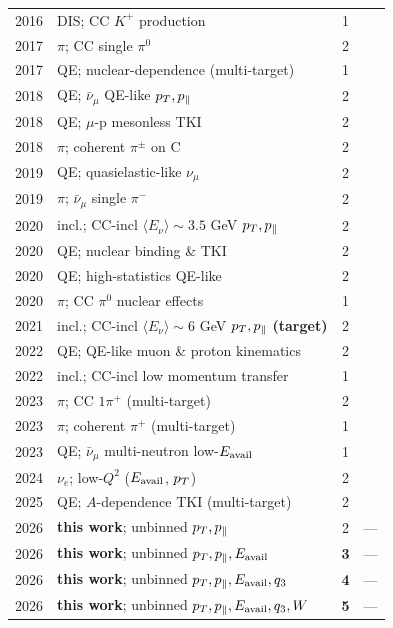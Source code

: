 {\begin{longtable}{@{}clcl@{}}
  2016 & DIS; CC $K^+$ production                  & 1 & \cite{MINERvA:2016kaon} \\
  2017 & $\pi$; CC single $\pi^0$                  & 2 & \cite{MINERvA:2017pi0} \\
  2017 & QE; nuclear-dependence (multi-target)     & 1 & \cite{MINERvA:2017Adep} \\
  2018 & QE; $\bar\nu_\mu$ QE-like $p_{T},p_{\parallel}$     & 2 & \cite{MINERvA:2018hba} \\
  2018 & QE; $\mu$-p mesonless TKI                 & 2 & \cite{MINERvA:2018tcb} \\
  2018 & $\pi$; coherent $\pi^\pm$ on C            & 2 & \cite{MINERvA:2018coh} \\
  2019 & QE; quasielastic-like $\nu_\mu$           & 2 & \cite{MINERvA:2019qe} \\
  2019 & $\pi$; $\bar\nu_\mu$ single $\pi^-$       & 2 & \cite{MINERvA:2019pim} \\
  2020 & incl.; CC-incl $\langle E_\nu\rangle\!\sim\!3.5$ GeV $p_{T},p_{\parallel}$ & 2 & \cite{MINERvA:2020jwd} \\
  2020 & QE; nuclear binding \& TKI               & 2 & \cite{MINERvA:2020cgh} \\
  2020 & QE; high-statistics QE-like              & 2 & \cite{MINERvA:2020qehs} \\
  2020 & $\pi$; CC $\pi^0$ nuclear effects        & 1 & \cite{MINERvA:2020pi0} \\
  2021 & incl.; CC-incl $\langle E_\nu\rangle\!\sim\!6$ GeV $p_{T},p_{\parallel}$ \textbf{(target)} & 2 & \cite{MINERvA:2021owq} \\
  2022 & QE; QE-like muon \& proton kinematics    & 2 & \cite{MINERvA:2022qe} \\
  2022 & incl.; CC-incl low momentum transfer     & 1 & \cite{MINERvA:2022incl} \\
  2023 & $\pi$; CC $1\pi^+$ (multi-target)        & 2 & \cite{MINERvA:2023ccpi} \\
  2023 & $\pi$; coherent $\pi^+$ (multi-target)   & 1 & \cite{MINERvA:2023coh} \\
  2023 & QE; $\bar\nu_\mu$ multi-neutron low-$E_{\mathrm{avail}}$ & 1 & \cite{MINERvA:2023lowEavail} \\
  2024 & $\nu_e$; low-$Q^2$ ($E_{\mathrm{avail}}$, $p_{T}$)    & 2 & \cite{MINERvA:2023avz} \\
  2025 & QE; $A$-dependence TKI (multi-target)    & 2 & \cite{MINERvA:2025tki} \\
  \midrule
  2026 & \textbf{this work}; unbinned $p_{T},p_{\parallel}$            & 2 & --- \\
  2026 & \textbf{this work}; unbinned $p_{T},p_{\parallel},E_{\mathrm{avail}}$    & \textbf{3} & --- \\
  2026 & \textbf{this work}; unbinned $p_{T},p_{\parallel},E_{\mathrm{avail}},q_{3}$ & \textbf{4} & --- \\
  2026 & \textbf{this work}; unbinned $p_{T},p_{\parallel},E_{\mathrm{avail}},q_{3},W$ & \textbf{5} & --- \\
\end{longtable}
}
